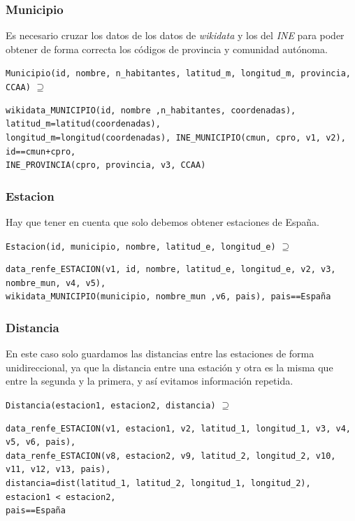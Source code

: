 \subsubsection{Municipio}\label{municipio}

Es necesario cruzar los datos de los datos de \emph{wikidata} y los del
\emph{INE} para poder obtener de forma correcta los códigos de provincia
y comunidad autónoma.

\texttt{Municipio(id,\ nombre,\ n\_habitantes,\ latitud\_m,\ longitud\_m,\ provincia,\ CCAA)}
\(\supseteq\)

\begin{verbatim}
wikidata_MUNICIPIO(id, nombre ,n_habitantes, coordenadas), latitud_m=latitud(coordenadas), 
longitud_m=longitud(coordenadas), INE_MUNICIPIO(cmun, cpro, v1, v2), id==cmun+cpro, 
INE_PROVINCIA(cpro, provincia, v3, CCAA)
\end{verbatim}

\subsubsection{Estacion}\label{estacion}

Hay que tener en cuenta que solo debemos obtener estaciones de España.

\texttt{Estacion(id,\ municipio,\ nombre,\ latitud\_e,\ longitud\_e)}
\(\supseteq\)

\begin{verbatim}
data_renfe_ESTACION(v1, id, nombre, latitud_e, longitud_e, v2, v3, nombre_mun, v4, v5), 
wikidata_MUNICIPIO(municipio, nombre_mun ,v6, pais), pais==España
\end{verbatim}

\subsubsection{Distancia}\label{distancia}

En este caso solo guardamos las distancias entre las estaciones de forma
unidireccional, ya que la distancia entre una estación y otra es la
misma que entre la segunda y la primera, y así evitamos información
repetida.

\texttt{Distancia(estacion1,\ estacion2,\ distancia)} \(\supseteq\)

\begin{verbatim}
data_renfe_ESTACION(v1, estacion1, v2, latitud_1, longitud_1, v3, v4, v5, v6, pais), 
data_renfe_ESTACION(v8, estacion2, v9, latitud_2, longitud_2, v10, v11, v12, v13, pais), 
distancia=dist(latitud_1, latitud_2, longitud_1, longitud_2), estacion1 < estacion2, 
pais==España
\end{verbatim}

